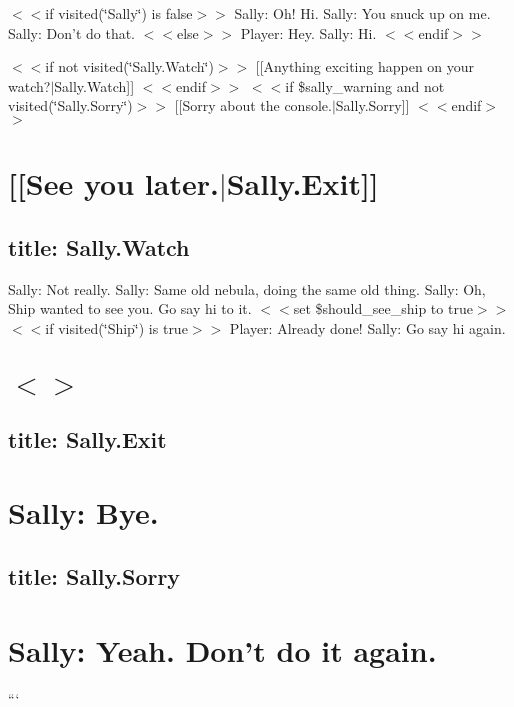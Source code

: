 $<$$<$if visited(\char`\"{}\-Sally\char`\"{}) is false$>$$>$ Sally\-: Oh! Hi. Sally\-: You snuck up on me. Sally\-: Don't do that. $<$$<$else$>$$>$ Player\-: Hey. Sally\-: Hi. $<$$<$endif$>$$>$

$<$$<$if not visited(\char`\"{}\-Sally.\-Watch\char`\"{})$>$$>$ \mbox{[}\mbox{[}Anything exciting happen on your watch?$\vert$\-Sally.Watch\mbox{]}\mbox{]} $<$$<$endif$>$$>$ $<$$<$if \$sally\-\_\-warning and not visited(\char`\"{}\-Sally.\-Sorry\char`\"{})$>$$>$ \mbox{[}\mbox{[}Sorry about the console.$\vert$\-Sally.Sorry\mbox{]}\mbox{]} $<$$<$endif$>$$>$ \section*{\mbox{[}\mbox{[}See you later.$\vert$\-Sally.Exit\mbox{]}\mbox{]} }

\subsection*{title\-: Sally.\-Watch }

Sally\-: Not really. Sally\-: Same old nebula, doing the same old thing. Sally\-: Oh, Ship wanted to see you. Go say hi to it. $<$$<$set \$should\-\_\-see\-\_\-ship to true$>$$>$ $<$$<$if visited(\char`\"{}\-Ship\char`\"{}) is true$>$$>$ Player\-: Already done! Sally\-: Go say hi again. \section*{$<$$>$ }

\subsection*{title\-: Sally.\-Exit }

\section*{Sally\-: Bye. }

\subsection*{title\-: Sally.\-Sorry }

\section*{Sally\-: Yeah. Don't do it again. }

``` 